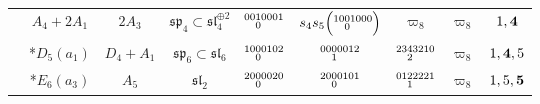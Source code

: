 \documentclass{amsart}
\theoremstyle{definition}
\newcommand{\C}{\mathbb{C}}
\newcommand{\0}{\mathcal{O}}
\begin{document}
\begin{table}[htp]
\begin{center}
\begin{tabular}{|c | c| c| c| c| c| c|c | c|}
	           & $A_4+2A_1$ & $2A_3$ & $\mathfrak{sp}_4\subset \mathfrak{sl}_4^{\oplus 2}$ & $\scriptsize{\begin{aligned}00 &10001 \\[-1.8mm] &0\end{aligned}}$ & $s_4s_5\!\left(\scriptsize{\begin{aligned}10 &01000 \\[-1.8mm] &0\end{aligned}}\right)$ 
               & $\varpi_8$ 
               & $\varpi_8$  
               & $\tiny{1,{\bf 4}}$ \\

            & *$D_5(a_1)$ & $D_4+A_1$ & $\mathfrak{sp}_6\subset \mathfrak{sl}_6$ & $\scriptsize{\begin{aligned}10 &00102 \\[-1.8mm] &0\end{aligned}}$ & $\scriptsize{\begin{aligned}00 &00012 \\[-1.8mm] &1\end{aligned}}$ 
            & $\scriptsize{\begin{aligned}2 3 &43210 \\[-1.8mm] &2\end{aligned}}$ 
            &  $\varpi_8$ 
            & $\tiny{1,{\bf 4},5}$  \\

                
				& *$E_6(a_3)$ & $A_5$ & $\mathfrak{sl}_2$ & $\scriptsize{\begin{aligned}20 &00020 \\[-1.8mm] &0\end{aligned}}$ & $\scriptsize{\begin{aligned}20 &00101 \\[-1.8mm] &0\end{aligned}}$ 
				& $\scriptsize{\begin{aligned}01 &22221 \\[-1.8mm] &1\end{aligned}}$ &  $\varpi_8$ 
                & $1,5,\bf{5}$  \\
				

\end{tabular}
\end{center}
\end{table}
\end{document}
